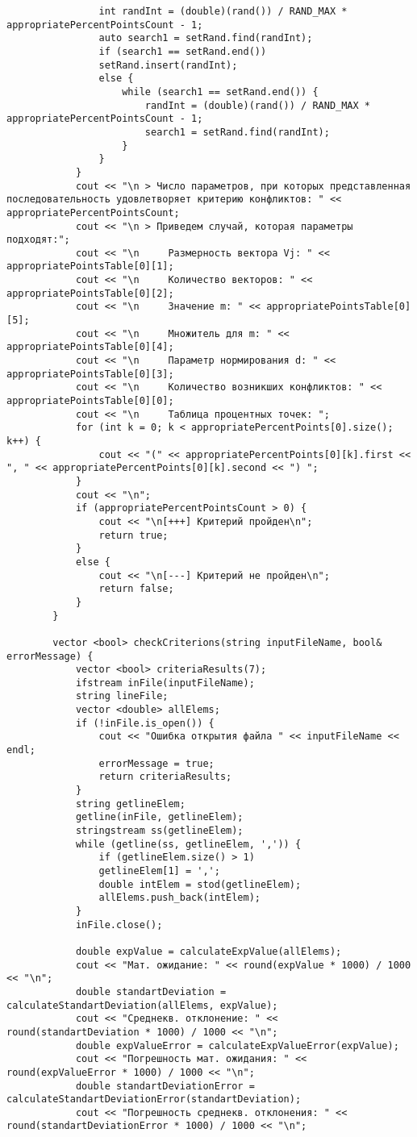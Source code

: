 \documentclass[bachelor, och, coursework]{shiza}
\begin{document}
\begin{verbatim}
				int randInt = (double)(rand()) / RAND_MAX * appropriatePercentPointsCount - 1;
				auto search1 = setRand.find(randInt);
				if (search1 == setRand.end())
				setRand.insert(randInt);
				else {
					while (search1 == setRand.end()) {
						randInt = (double)(rand()) / RAND_MAX * appropriatePercentPointsCount - 1;
						search1 = setRand.find(randInt);
					}
				}
			}
			cout << "\n > Число параметров, при которых представленная последовательность удовлетворяет критерию конфликтов: " << appropriatePercentPointsCount;
			cout << "\n > Приведем случай, которая параметры подходят:";
			cout << "\n     Размерность вектора Vj: " << appropriatePointsTable[0][1];
			cout << "\n     Количество векторов: " << appropriatePointsTable[0][2];
			cout << "\n     Значение m: " << appropriatePointsTable[0][5];
			cout << "\n     Множитель для m: " << appropriatePointsTable[0][4];
			cout << "\n     Параметр нормирования d: " << appropriatePointsTable[0][3];
			cout << "\n     Количество возникших конфликтов: " << appropriatePointsTable[0][0];
			cout << "\n     Таблица процентных точек: ";
			for (int k = 0; k < appropriatePercentPoints[0].size(); k++) {
				cout << "(" << appropriatePercentPoints[0][k].first << ", " << appropriatePercentPoints[0][k].second << ") ";
			}
			cout << "\n";
			if (appropriatePercentPointsCount > 0) {
				cout << "\n[+++] Критерий пройден\n";
				return true;
			}
			else {
				cout << "\n[---] Критерий не пройден\n";
				return false;
			}
		}
		
		vector <bool> checkCriterions(string inputFileName, bool& errorMessage) {
			vector <bool> criteriaResults(7);
			ifstream inFile(inputFileName);
			string lineFile;
			vector <double> allElems;
			if (!inFile.is_open()) {
				cout << "Ошибка открытия файла " << inputFileName << endl;
				errorMessage = true;
				return criteriaResults;
			}
			string getlineElem;
			getline(inFile, getlineElem);
			stringstream ss(getlineElem);
			while (getline(ss, getlineElem, ',')) {
				if (getlineElem.size() > 1)
				getlineElem[1] = ',';
				double intElem = stod(getlineElem);
				allElems.push_back(intElem);
			}
			inFile.close();
			
			double expValue = calculateExpValue(allElems);
			cout << "Мат. ожидание: " << round(expValue * 1000) / 1000 << "\n";
			double standartDeviation = calculateStandartDeviation(allElems, expValue);
			cout << "Среднекв. отклонение: " << round(standartDeviation * 1000) / 1000 << "\n";
			double expValueError = calculateExpValueError(expValue);
			cout << "Погрешность мат. ожидания: " << round(expValueError * 1000) / 1000 << "\n";
			double standartDeviationError = calculateStandartDeviationError(standartDeviation);
			cout << "Погрешность среднекв. отклонения: " << round(standartDeviationError * 1000) / 1000 << "\n";
			

\end{verbatim}
\end{document}
